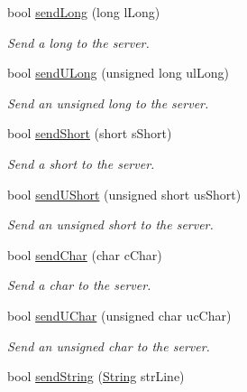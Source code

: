 \begin{DoxyCompactItemize}
bool \mbox{\hyperlink{class_rad_j_a_v_1_1_networking_1_1wx_widgets_t_c_p_client_aaa40b254965bfc2b4d3b27877602da9c}{send\+Long}} (long l\+Long)
\begin{DoxyCompactList}\small\item\em Send a long to the server. \end{DoxyCompactList}\item 
bool \mbox{\hyperlink{class_rad_j_a_v_1_1_networking_1_1wx_widgets_t_c_p_client_a8440ad8c4446f1525329cfe40d630ead}{send\+U\+Long}} (unsigned long ul\+Long)
\begin{DoxyCompactList}\small\item\em Send an unsigned long to the server. \end{DoxyCompactList}\item 
bool \mbox{\hyperlink{class_rad_j_a_v_1_1_networking_1_1wx_widgets_t_c_p_client_afeb26d6478b3c8f869f67c41e3105bec}{send\+Short}} (short s\+Short)
\begin{DoxyCompactList}\small\item\em Send a short to the server. \end{DoxyCompactList}\item 
bool \mbox{\hyperlink{class_rad_j_a_v_1_1_networking_1_1wx_widgets_t_c_p_client_a909ddced28c91178cfc77be15e79751d}{send\+U\+Short}} (unsigned short us\+Short)
\begin{DoxyCompactList}\small\item\em Send an unsigned short to the server. \end{DoxyCompactList}\item 
bool \mbox{\hyperlink{class_rad_j_a_v_1_1_networking_1_1wx_widgets_t_c_p_client_a3fdaa69183625a5555d99da0a32c6700}{send\+Char}} (char c\+Char)
\begin{DoxyCompactList}\small\item\em Send a char to the server. \end{DoxyCompactList}\item 
bool \mbox{\hyperlink{class_rad_j_a_v_1_1_networking_1_1wx_widgets_t_c_p_client_ae50f5c377cd8116159f7afa5e7f0bbd5}{send\+U\+Char}} (unsigned char uc\+Char)
\begin{DoxyCompactList}\small\item\em Send an unsigned char to the server. \end{DoxyCompactList}\item 
bool \mbox{\hyperlink{class_rad_j_a_v_1_1_networking_1_1wx_widgets_t_c_p_client_a2282375d71da7b7d38ef06a977e46827}{send\+String}} (\mbox{\hyperlink{class_rad_j_a_v_1_1_string}{String}} str\+Line)

\end{DoxyCompactItemize}
